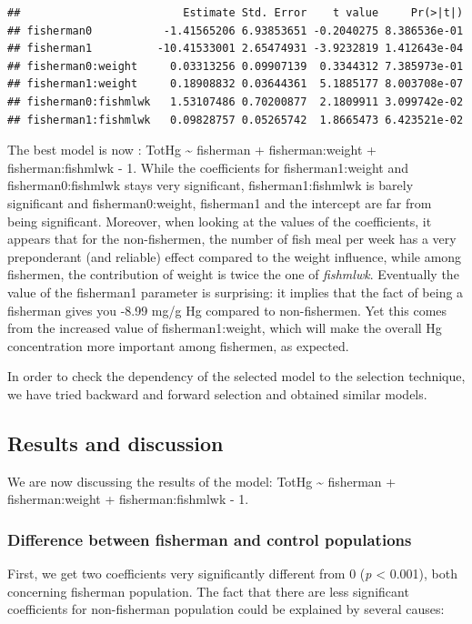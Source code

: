 \documentclass[12pt,]{article}
\begin{document}
\begin{verbatim}
##                         Estimate Std. Error    t value     Pr(>|t|)
## fisherman0           -1.41565206 6.93853651 -0.2040275 8.386536e-01
## fisherman1          -10.41533001 2.65474931 -3.9232819 1.412643e-04
## fisherman0:weight     0.03313256 0.09907139  0.3344312 7.385973e-01
## fisherman1:weight     0.18908832 0.03644361  5.1885177 8.003708e-07
## fisherman0:fishmlwk   1.53107486 0.70200877  2.1809911 3.099742e-02
## fisherman1:fishmlwk   0.09828757 0.05265742  1.8665473 6.423521e-02
\end{verbatim}

The best model is now : TotHg \textasciitilde{} fisherman +
fisherman:weight + fisherman:fishmlwk - 1. While the coefficients for
fisherman1:weight and fisherman0:fishmlwk stays very significant,
fisherman1:fishmlwk is barely significant and fisherman0:weight,
fisherman1 and the intercept are far from being significant. Moreover,
when looking at the values of the coefficients, it appears that for the
non-fishermen, the number of fish meal per week has a very preponderant
(and reliable) effect compared to the weight influence, while among
fishermen, the contribution of weight is twice the one of
\emph{fishmlwk}. Eventually the value of the fisherman1 parameter is
surprising: it implies that the fact of being a fisherman gives you
-8.99 mg/g Hg compared to non-fishermen. Yet this comes from the
increased value of fisherman1:weight, which will make the overall Hg
concentration more important among fishermen, as expected.

In order to check the dependency of the selected model to the selection
technique, we have tried backward and forward selection and obtained
similar models.

\subsection{Results and discussion}\label{results-and-discussion}

We are now discussing the results of the model: TotHg \textasciitilde{}
fisherman + fisherman:weight + fisherman:fishmlwk - 1.

\subsubsection{Difference between fisherman and control
populations}\label{difference-between-fisherman-and-control-populations}

First, we get two coefficients very significantly different from 0
(\emph{p} \textless{} 0.001), both concerning fisherman population. The
fact that there are less significant coefficients for non-fisherman
population could be explained by several causes:
\end{document}
